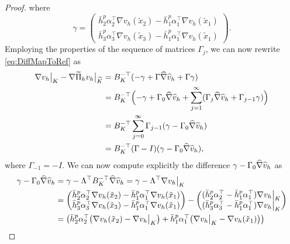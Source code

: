 \documentclass[10pt]{article}
\begin{document}
\begin{proof}
where 
\begin{equation}
	\gamma = \begin{pmatrix} \bar h_2^p \alpha_2^\top \nabla v_h(\tilde x_2) - \bar h_1^p \alpha_1^\top \nabla v_h(\tilde x_1) \\
	\bar h_3^p \alpha_3^\top \nabla v_h(\tilde x_3) - \bar h_1^p \alpha_1^\top \nabla v_h(\tilde x_1) \end{pmatrix}.
\end{equation}
Employing the properties of the sequence of matrices $\Gamma_j$, we can now rewrite \eqref{eq:DiffMapToRef} as
\begin{equation}\label{eq:SumExpansionGradGradTilde}
\begin{aligned}
	\nabla v_h\bigr\rvert_{K} - \nabla \widetilde \Pi_h v_h \bigr\rvert_{\widetilde K} &= B_K^{-\top}(-\gamma + \Gamma \widehat \nabla \widehat v_h + \Gamma \gamma) \\
	&= B_K^{-\top} \Bigl(-\gamma + \Gamma_0 \widehat \nabla \widehat v_h + \sum_{j=1}^\infty (\Gamma_j \widehat \nabla \widehat v_h + \Gamma_{j-1} \gamma)\Bigr) \\
	&= B_K^{-\top} \sum_{j=0}^\infty \Gamma_{j-1} (\gamma -\Gamma_0 \widehat \nabla \widehat v_h)\\
	&= B_K^{-\top} (\Gamma - I) (\gamma -\Gamma_0 \widehat \nabla \widehat v_h),
\end{aligned}
\end{equation}
where $\Gamma_{-1} = -I$. We can now compute explicitly the difference $\gamma - \Gamma_0 \widehat\nabla \widehat v_h$ as
\begin{equation}
\begin{aligned}
	\gamma - \Gamma_0 \widehat \nabla \widehat v_h &= \gamma - \Lambda^\top B_K^{-\top} \widehat \nabla \widehat v_h = \gamma - \Lambda^\top \nabla v_h \bigr\rvert_{K} \\
	&= \begin{pmatrix}  \bar h_2^p \alpha_2^\top \nabla v_h(\tilde x_2) - \bar h_1^p \alpha_1^\top \nabla v_h(\tilde x_1) \\
						\bar h_3^p \alpha_3^\top \nabla v_h(\tilde x_3) - \bar h_1^p \alpha_1^\top \nabla v_h(\tilde x_1) \end{pmatrix}
	- \begin{pmatrix} (\bar h_2^p \alpha_2^\top - \bar h_1^p \alpha_1^\top) \nabla v_h \bigr\rvert_{K} \\ (\bar h_3^p \alpha_3^\top - \bar h_1^p \alpha_1^\top) \nabla v_h \bigr\rvert_{K} \end{pmatrix}\\
	&= \begin{pmatrix} \bar h_2^p \alpha_2^\top \big(\nabla v_h(\tilde x_2) - \nabla v_h \bigr\rvert_{K}\big) + \bar h_1^p \alpha_1^\top \big(\nabla v_h \bigr\rvert_{K} - \nabla v_h(\tilde x_1)\big) \\

\end{pmatrix}
\end{aligned}
\end{equation}
\end{proof}
\end{document}
